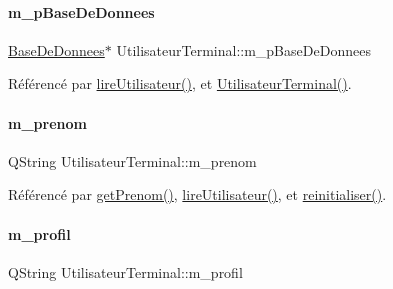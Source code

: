 \mbox{\label{class_utilisateur_terminal_a93aefda4243fed6c1b74d78fa5fc954d}} 
\paragraph{\texorpdfstring{m\+\_\+p\+Base\+De\+Donnees}{m\_pBaseDeDonnees}}
{\footnotesize\ttfamily \hyperlink{class_base_de_donnees}{Base\+De\+Donnees}$\ast$ Utilisateur\+Terminal\+::m\+\_\+p\+Base\+De\+Donnees\hspace{0.3cm}{\ttfamily [private]}}



Référencé par \hyperlink{class_utilisateur_terminal_a196420ecc14bc0645e3e1c66d796b8e6}{lire\+Utilisateur()}, et \hyperlink{class_utilisateur_terminal_a3a4e47b0f67f67f2396671941688d036}{Utilisateur\+Terminal()}.

\mbox{\label{class_utilisateur_terminal_a6dc3be09e844fc14aafec8019a1e2a5e}} 
\paragraph{\texorpdfstring{m\+\_\+prenom}{m\_prenom}}
{\footnotesize\ttfamily Q\+String Utilisateur\+Terminal\+::m\+\_\+prenom\hspace{0.3cm}{\ttfamily [private]}}



Référencé par \hyperlink{class_utilisateur_terminal_ac38fe2414a0dcb53d0f283f231dcba01}{get\+Prenom()}, \hyperlink{class_utilisateur_terminal_a196420ecc14bc0645e3e1c66d796b8e6}{lire\+Utilisateur()}, et \hyperlink{class_utilisateur_terminal_a63b37fa7cbf08976e5a09cbfbdb55f42}{reinitialiser()}.

\mbox{\label{class_utilisateur_terminal_ac25eb049eaa55bc16d2f516a551eb769}} 
\paragraph{\texorpdfstring{m\+\_\+profil}{m\_profil}}
{\footnotesize\ttfamily Q\+String Utilisateur\+Terminal\+::m\+\_\+profil\hspace{0.3cm}{\ttfamily [private]}}




